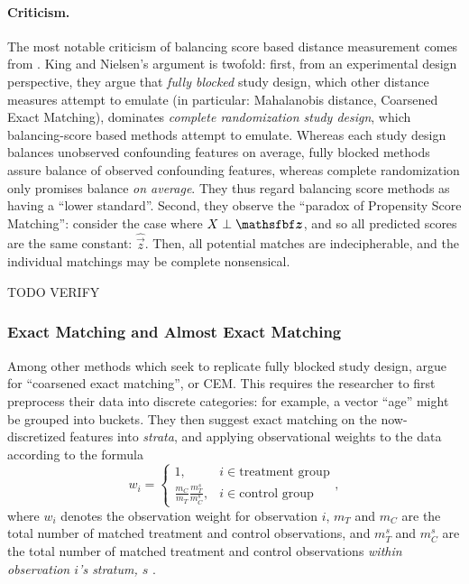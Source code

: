 \documentclass[11pt]{extarticle}
\begin{document}
\paragraph{Criticism.} The most notable criticism of balancing score based distance measurement comes from \textcite{king_why_2019}. King and Nielsen's argument is twofold: first, from an experimental design perspective, they argue that \emph{fully blocked} study design, which other distance measures attempt to emulate (in particular: Mahalanobis distance, Coarsened Exact Matching), dominates \emph{complete randomization study design}, which balancing-score based methods attempt to emulate.
Whereas each study design balances unobserved confounding features on average, fully blocked methods assure balance of observed confounding features, whereas complete randomization only promises balance \emph{on average}.
They thus regard balancing score methods as having a ``lower standard''.
Second, they observe the ``paradox of Propensity Score Matching'': consider the case where $\mat{X} \perp \vec{z}$, and so all predicted scores are the same constant: $\hat{\vec{z}}$.
Then, all potential matches are indecipherable, and the individual matchings may be complete nonsensical.

TODO VERIFY

\subsubsection{Exact Matching and Almost Exact Matching}
\label{subsubsec:exactmatching}

Among other methods which seek to replicate fully blocked study design, \textcite{king_why_2019} argue for ``coarsened exact matching'', or CEM. This requires the researcher to first preprocess their data into discrete categories: for example, a vector ``age'' might be grouped into buckets. They then suggest exact matching on the now-discretized features into \emph{strata}, and applying observational weights to the data according to the formula
\begin{equation}
  w_{i}= \begin{cases}1, & i \in \text{treatment group} \\ \frac{m_{C}}{m_{T}} \frac{m_{T}^{s}}{m_{C}^{s}}, & i \in \text{control group} \end{cases},
\end{equation}
where $w_i$ denotes the observation weight for observation $i$, $m_T$ and $m_C$ are the total number of matched treatment and control observations, and $m_T^s$ and $m_C^s$ are the total number of matched treatment and control observations \emph{within observation $i$'s stratum, $s$} \parencite{iacus_causal_2012}.
\end{document}
